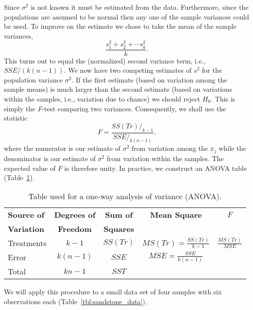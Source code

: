 	Since $\sigma^2$ is not known it must be estimated from the data.  Furthermore, since the populations are assumed to be normal then any 
one of the sample variances could be used.  To improve on the estimate we chose to take the mean of the sample variances,
\begin{equation}
\frac{s^2_1 + s^2_2 + \cdots s^2_k}{k}.
\end{equation}	 
This turns out to equal the (normalized) second variance term, i.e., $SSE/(k(n-1))$.  We now have two competing estimates of $s^2$ for the population 
variance $\sigma^2$.  If the first estimate (based on variation among the sample means) is much larger 
than the second estimate (based on variations within the samples, i.e., variation due to chance) we 
should reject $H_0$.   This is simply the \emph{F}-test comparing two variances.  Consequently, we shall use the 
statistic
\begin{equation}
F = \frac{SS(Tr)/_{k-1}}{SSE/_{k(n-1)}}.
\end{equation}
where the numerator is our estimate of $\sigma^2$ from variation among the $\bar{x}_j$ while the
denominator is our estimate of $\sigma^2$ from variation within the samples.  The expected value of $F$ is therefore unity.
In practice, we construct an ANOVA table (Table~\ref{tbl:one_way_ANOVA}).
\begin{table}[H]
\center
\begin{tabular}{|l|c|c|c|c|} \hline
\bf{Source of} & \bf{Degrees of} & \bf{Sum of} & \bf{Mean Square} & $F$ \\ 
\bf{Variation} & \bf{Freedom} & \bf{Squares} & &  \\ \hline
\rule{0pt}{4ex}Treatments & $k - 1$ & $SS(Tr)$ & $MS(Tr) = \displaystyle \frac{SS(Tr)}{k-1}$ & $ \displaystyle \frac{MS(Tr)}{MSE}$\\[9pt]  \hline
\rule{0pt}{4ex}Error & $k(n - 1)$ & $SSE$ &  $MSE = \displaystyle \frac{SSE}{k(n-1)}$ &  \\[9pt] \hline
Total & $kn-1$ & $SST$ & & \\ \hline
\end{tabular}
\caption{Table used for a one-way analysis of variance (ANOVA).}
\label{tbl:one_way_ANOVA}
\end{table}
We will apply this procedure to a small data set of four samples with six observations each (Table~\ref{tbl:sandstone_data}).
